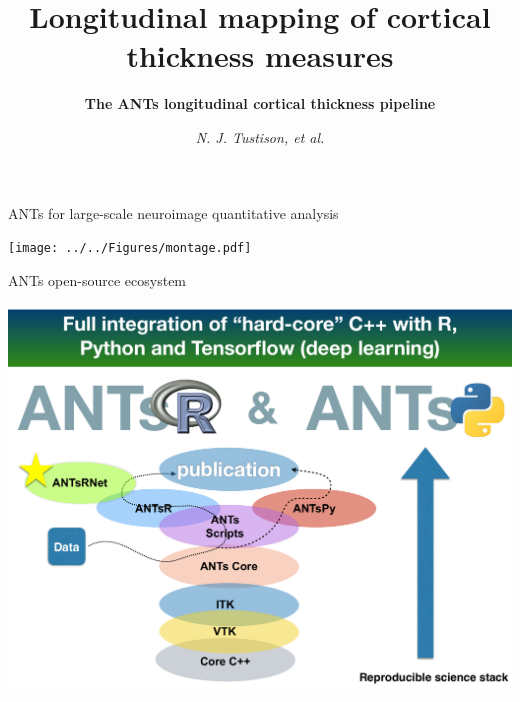 \documentclass[ignorenonframetext,]{beamer}
\institute{UVa/UCI}
\title{\textbf{Longitudinal mapping of cortical thickness measures}}
\subtitle{\textbf{The ANTs longitudinal cortical thickness pipeline}}
\author{\emph{N. J. Tustison, et al.}}
\date{}
\begin{document}
\frame{\titlepage}

\begin{frame}{ANTs for large-scale neuroimage quantitative analysis}

\vspace*{-.225cm} \hspace*{-.5cm}
\texttt{[image: ../../Figures/montage.pdf]}

\end{frame}

\begin{frame}{ANTs open-source ecosystem}

\usebackgroundtemplate{\texttt{[image: ]}}

\vspace*{-.225cm} \hspace*{-.5cm}
\includegraphics[width=1.07\textwidth,height=0.92\textheight]{../../Figures/antsEcosystem.pdf}

\end{frame}
\end{document}
